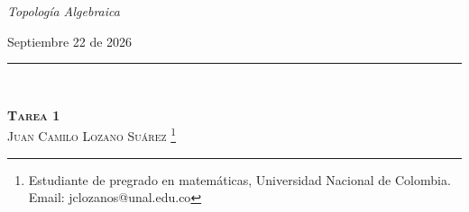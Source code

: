 \normalsize{
    \noindent\textit{Topología Algebraica}

    \vspace{-0.1cm}
    \noindent Septiembre 22 de 2026
    
    \vspace{-0.2cm}
}
\noindent\rule{10cm}{0.1pt}\\
\vspace{0.5cm}
\begin{center}
   \textsc{
      \Large{\textbf{Tarea 1}}
   }\\ \vspace{0.7cm}
   \large{\textsc{Juan Camilo Lozano Suárez \footnote{Estudiante de pregrado en matemáticas, Universidad Nacional de Colombia.\\Email: jclozanos@unal.edu.co}}}\\ \vspace{0.5cm}
\end{center}
\hspace{3.5cm} \hrulefill \hspace{3.5cm}
